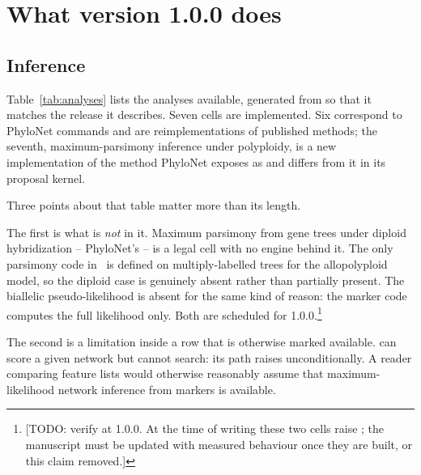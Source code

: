 \section{What version 1.0.0 does}
\label{sec:functionality}

\subsection{Inference}

Table~\ref{tab:analyses} lists the analyses available, generated from
 so that it matches the release it describes. Seven
cells are implemented. Six correspond to PhyloNet commands and are
reimplementations of published methods; the seventh, maximum-parsimony
inference under polyploidy, is a new implementation of the method PhyloNet
exposes as  and differs from it in its proposal
kernel.

\begin{table}[t]
  \centering
  \scriptsize
  
  \caption{Analyses in \phynetpy\ 1.0.0. Rows are generated from the dispatch
  registry. ``Reimplementation'' means the method was published elsewhere and
  implemented here from its description; the  row is marked as
  a new implementation because its search uses a single ploidy-preserving move
  rather than the six moves of the original. The lower block lists
  combinations that are well defined but carry no engine, and therefore raise
   rather than failing obscurely.%
  }
  \label{tab:analyses}
\end{table}

Three points about that table matter more than its length.

The first is what is \emph{not} in it. Maximum parsimony from gene trees under
diploid hybridization -- PhyloNet's  -- is a legal cell
with no engine behind it. The only parsimony code in \phynetpy\ is defined on
multiply-labelled trees for the allopolyploid model, so the diploid case is
genuinely absent rather than partially present. The biallelic
pseudo-likelihood is absent for the same kind of reason: the marker code
computes the full likelihood only. Both are scheduled for
1.0.0.\footnote{[TODO: verify at 1.0.0. At the time of writing these two cells
raise ; the manuscript must be updated with measured
behaviour once they are built, or this claim removed.]}

The second is a limitation inside a row that is otherwise marked available.
 can score a given network but cannot search: its
 path raises unconditionally. A reader comparing feature lists
would otherwise reasonably assume that maximum-likelihood network inference
from markers is available.

